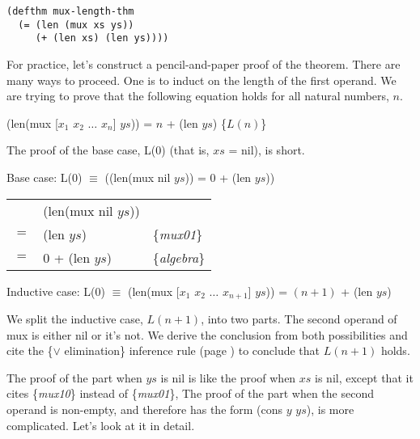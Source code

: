 \label{mux-length-thm}
\begin{Verbatim}
(defthm mux-length-thm
  (= (len (mux xs ys))
     (+ (len xs) (len ys))))
\end{Verbatim}

For practice, let's construct a pencil-and-paper proof of the theorem.
There are many ways to proceed.
One is to induct on the length of the first operand.
We are trying to prove that the following equation holds for all natural numbers, $n$.

\hspace{1cm} (len(mux [$x_1$ $x_2$ $\dots$ $x_n$] $ys$)) = $n$ + (len $ys$) \hfill \{$L(n)$\}

The proof of the base case, L(0) (that is, $xs$ = nil), is short.

Base case: L(0) $\equiv$ ((len(mux nil $ys$)) = 0 + (len $ys$))

\begin{center}
\begin{tabular}{lll}
    & (len(mux nil $ys$))                             &                     \\
$=$ & (len $ys$)                                      & \{\emph{mux01}\}    \\
$=$ & 0 + (len $ys$)                                  & \{\emph{algebra}\}  \\
\end{tabular}
\end{center}

\label{mux-length-thm-induc-case}
Inductive case: L(0) $\equiv$ (len(mux [$x_1$ $x_2$ $\dots$ $x_{n+1}$] $ys$)) = $(n+1)$ + (len $ys$)

We split the inductive case, $L(n+1)$, into two parts.
The second operand of mux is either nil or it's not.
We derive the conclusion from both possibilities and cite the \{$\vee$ elimination\}
inference rule (page \pageref{fig-02-deduction-rules})
to conclude that $L(n+1)$ holds.

The proof of the part when $ys$ is nil is like the proof when $xs$ is nil,
except that it cites \{\emph{mux10}\} instead of \{\emph{mux01}\},
The proof of the part when the second operand is non-empty,
and therefore has the form (cons $y$ $ys$),
is more complicated. Let's look at it in detail.

